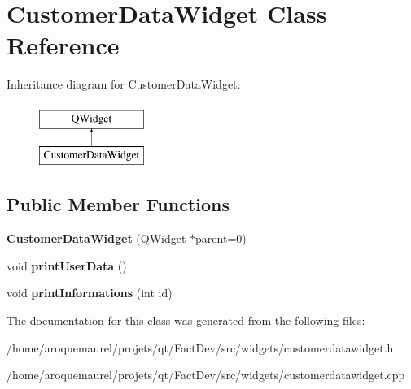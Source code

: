 \hypertarget{classCustomerDataWidget}{\section{Customer\-Data\-Widget Class Reference}
\label{classCustomerDataWidget}
}
Inheritance diagram for Customer\-Data\-Widget\-:\begin{figure}[H]
\begin{center}
\leavevmode
\includegraphics[height=2.000000cm]{df/df4/classCustomerDataWidget}
\end{center}
\end{figure}
\subsection*{Public Member Functions}
\begin{DoxyCompactItemize}
\item 
\hypertarget{classCustomerDataWidget_ae629d9d3839bd9f067927b19e1bb85cd}{{\bfseries Customer\-Data\-Widget} (Q\-Widget $\ast$parent=0)}\label{classCustomerDataWidget_ae629d9d3839bd9f067927b19e1bb85cd}

\item 
\hypertarget{classCustomerDataWidget_a9a56bd1d7faf76d083cfa97f2883bdf1}{void {\bfseries print\-User\-Data} ()}\label{classCustomerDataWidget_a9a56bd1d7faf76d083cfa97f2883bdf1}

\item 
\hypertarget{classCustomerDataWidget_ab61052cc337e51d1e34149d67816c58f}{void {\bfseries print\-Informations} (int id)}\label{classCustomerDataWidget_ab61052cc337e51d1e34149d67816c58f}

\end{DoxyCompactItemize}


The documentation for this class was generated from the following files\-:\begin{DoxyCompactItemize}
\item 
/home/aroquemaurel/projets/qt/\-Fact\-Dev/src/widgets/customerdatawidget.\-h\item 
/home/aroquemaurel/projets/qt/\-Fact\-Dev/src/widgets/customerdatawidget.\-cpp\end{DoxyCompactItemize}
